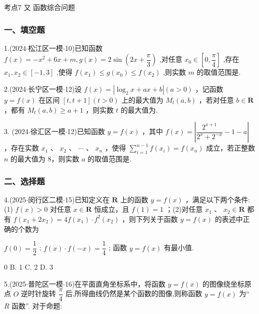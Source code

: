 考点7 又 函数综合问题

\subsubsection*{一、填空题}

1.(2024$\cdot$松江区一模$\cdot$10)已知函数 $f\left( x\right)  =  - {x}^{2} + {6x} + m,g\left( x\right)  = 2\sin \left( {{2x} + \dfrac{\pi }{3}}\right)$ ,对任意 ${x}_{0} \in  \left\lbrack  {0,\dfrac{\pi }{4}}\right\rbrack$ ,存在 ${x}_{1},{x}_{2} \in  \left\lbrack  {-1,3}\right\rbrack$ ,使得 $f\left( {x}_{1}\right)  \leq  g\left( {x}_{0}\right)  \leq  f\left( {x}_{2}\right)$ ,则实数 $m$ 的取值范围是\blkda[2]{}.

2.(2024$\cdot$长宁区一模$\cdot$12)设 $f\left( x\right)  = \left| {{\log }_{2}x + {ax} + b}\right| \left( {a > 0}\right)$ ，记函数 $y = f\left( x\right)$ 在区间 $\left\lbrack  {t,t + 1}\right\rbrack  \left( {t > 0}\right)$ 上的最大值为 ${M}_{t}\left( {a,b}\right)$ ，若对任意 $b \in  \mathbf{R}$ ，都有 ${M}_{t}\left( {a,b}\right)  \geq  a + 1$ ，则实数 $t$ 的最大值为\blkda[2]{}.

3. (2024$\cdot$徐汇区一模$\cdot$12)已知函数 $y = f\left( x\right)$ ，其中 $f\left( x\right)  = \left| {\dfrac{{2}^{x + 1}}{{2}^{x} + {2}^{-x}} - 1 - a}\right|$ ，存在实数 ${x}_{1}$ 、 ${x}_{2}$ 、 $\cdots$ 、 ${x}_{n}$ ，使得 $\mathop{\sum }\limits_{{i = 1}}^{{n - 1}}f\left( {x}_{i}\right)  = f\left( {x}_{n}\right)$ 成立，若正整数 $n$ 的最大值为 8，则实数 $a$ 的取值范围是\blkda[2]{}.

\subsubsection*{二、选择题}

4.(2025$\cdot$闵行区二模$\cdot$15)已知定义在 $\mathbf{R}$ 上的函数 $y = f\left( x\right)$ ，满足以下两个条件:(1) $f\left( x\right)  > 0$ 对任意 $x \in  \mathbf{R}$ 恒成立，且 $f\left( 1\right)  = 1$ ；(2)对任意 ${x}_{1}$ 、 ${x}_{2} \in  \mathbf{R}$ 都有 $f\left( {{x}_{1} + 2{x}_{2}}\right)  = {4f}\left( {x}_{1}\right)  \cdot  {f}^{2}\left( {x}_{2}\right)$ ，则下列关于函数 $y = f\left( x\right)$ 的表述中正确的个数为 \dotfill{(\kh{})}

   $f\left( 0\right)  = \dfrac{1}{2}$ ;    $f\left( x\right)  \cdot  f\left( {-x}\right)  = \dfrac{1}{4}$ ;    函数 $y = f\left( x\right)$ 有最小值.

\xx{}{}{}{}0 B. 1 C. 2 D. 3

5.(2025$\cdot$普陀区一模$\cdot$16)在平面直角坐标系中，将函数 $y = f\left( x\right)$ 的图像绕坐标原点 $O$ 逆时针旋转 $\dfrac{\pi }{4}$ 后,所得曲线仍然是某个函数的图像,则称函数 $y = f\left( x\right)$ 为“ $R$ 函数”. 对于命题:

